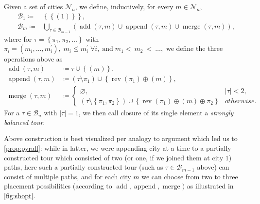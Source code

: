 \documentclass[titlepage,twoside,index=totoc,bibliography=totoc]{scrartcl}
\numberwithin{equation}{section}
\numberwithin{figure}{section}
\numberwithin{table}{section}
\let\defstyle\itshape
\begin{document}
\begin{define}
\label{def:sbtour}
  Given a set of cities $\mathcal{N}_n$, we define, inductively,
  for every $m \in \mathcal{N}_n$,
  \begin{align*}
    \mathcal{B}_1 \coloneqq & \left\{ \left\{\left(1\right)\right\} \right\},
    \\
    \mathcal{B}_m \coloneqq & \bigcup_{\tau \in \mathcal{B}_{m-1}}
      \left(
      \operatorname{add}\left(\tau,m\right)
      \cup
      \operatorname{append}\left(\tau,m\right)
      \cup
      \operatorname{merge}\left(\tau,m\right)
      \right),
  \end{align*}
  where for $ \tau = \left\{ \pi_1, \pi_2, \ldots \right\} $ with
  $
    \pi_i = \left(m_i,\ldots,m_i^\prime\right), \;
    m_i \leq m_i^\prime \; \forall i, \;
    \text{and} \; m_1 <~ m_2~ <~\ldots,
  $
  we define the three operations above as
  \begin{align*}
    \operatorname{add}\left(\tau,m\right)
    & \coloneqq \tau \cup \left\{ \left(m\right) \right\},\\
    \operatorname{append}\left(\tau,m\right)
    & \coloneqq \left( \tau \setminus \pi_1 \right) \cup \left\{ \operatorname{rev}\left(\pi_1\right) \oplus \left(m\right) \right\},\\
    \operatorname{merge}\left(\tau,m\right)
    & \coloneqq
    \begin{cases}
      \varnothing, & \lvert\tau\rvert < 2,
      \\
      \left( \tau \setminus \left\{\pi_1,\pi_2\right\} \right)
      \cup \left\{ \operatorname{rev}\left(\pi_1\right) \oplus \left(m\right) \oplus \pi_2 \right\}
      & otherwise.
    \end{cases}
  \end{align*}
  For a $\tau \in \mathcal{B}_n$ with $\left|\tau\right| = 1$,
  we then call closure of its single element a {\defstyle strongly balanced tour}.
\end{define}

Above construction is best visualized per analogy to argument which led us
to \cref{prop:pyrall}: while in latter, we were appending city at a time to
a partially constructed tour which consisted of two (or one, if we joined
them at city $1$) paths, here such a partially constructed tour (such as
$\tau \in \mathcal{B}_{m-1}$ above) can consist of multiple paths, and for each city
$m$ we can choose from two to three placement possibilities (according to
$\operatorname{add}, \operatorname{append}, \operatorname{merge})$ as
illustrated in \cref{fig:sbopt}.
\end{document}
